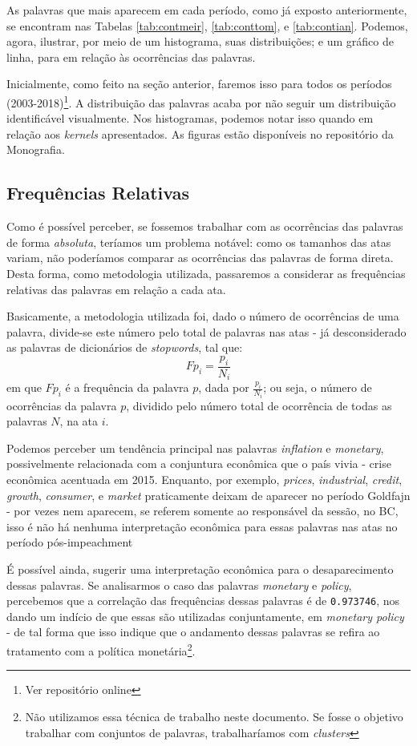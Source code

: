 As palavras que mais aparecem em cada período, como já exposto anteriormente, se encontram nas Tabelas \ref{tab:contmeir}, \ref{tab:conttom}, e \ref{tab:contian}. Podemos, agora, ilustrar, por meio de um histograma, suas distribuições; e um gráfico de linha, para em relação às ocorrências das palavras.

Inicialmente, como feito na seção anterior, faremos isso para todos os períodos (2003-2018)\footnote{Ver repositório online}. A distribuição das palavras acaba por não seguir um distribuição identificável visualmente. Nos histogramas, podemos notar isso quando em relação aos \textit{kernels} apresentados. As figuras estão disponíveis no repositório da Monografia.

\subsection{Frequências Relativas}

Como é possível perceber, se fossemos trabalhar com as ocorrências das palavras de forma \textit{absoluta}, teríamos um problema notável: como os tamanhos das atas variam, não poderíamos comparar as ocorrências das palavras de forma direta. Desta forma, como metodologia utilizada, passaremos a considerar as frequências relativas das palavras em relação a cada ata.

Basicamente, a metodologia utilizada foi, dado o número de ocorrências de uma palavra, divide-se este número pelo total de palavras nas atas - já desconsiderado as palavras de dicionários de \textit{stopwords}, tal que:
$$Fp_i = \frac{p_i}{N_i}$$
\noindent
em que $Fp_i$ é a frequência da palavra $p$, dada por $\frac{p_i}{N_i}$; ou seja, o número de ocorrências da palavra $p$, dividido pelo número total de ocorrência de todas as palavras $N$, na ata $i$.

Podemos perceber um tendência principal nas palavras \textit{inflation} e \textit{monetary}, possivelmente relacionada com a conjuntura econômica que o país vivia - crise econômica acentuada em 2015. Enquanto, por exemplo, \textit{prices}, \textit{industrial}, \textit{credit}, \textit{growth}, \textit{consumer}, e \textit{market} praticamente deixam de aparecer no período Goldfajn - por vezes nem aparecem, se referem somente ao responsável da sessão, no BC, isso é não há nenhuma interpretação econômica para essas palavras nas atas no período pós-impeachment

É possível ainda, sugerir uma interpretação econômica para o desaparecimento dessas palavras. Se analisarmos o caso das palavras \textit{monetary} e \textit{policy}, percebemos que a correlação das frequências dessas palavras é de \texttt{0.973746}, nos dando um indício de que essas são utilizadas conjuntamente, em \textit{monetary policy} - de tal forma que isso indique que o andamento dessas palavras se refira ao tratamento com a política monetária\footnote{Não utilizamos essa técnica de trabalho neste documento. Se fosse o objetivo trabalhar com conjuntos de palavras, trabalharíamos com \textit{clusters}}.  

